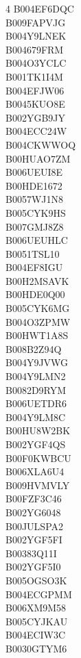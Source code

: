 \begin{multicols}{4}
	B004EF6DQC\\ B009FAPVJG\\ B004Y9LNEK\\ B004679FRM\\ B004O3YCLC\\ B001TK1I4M\\
	B004EFJW06\\ B0045KUO8E\\ B002YGB9JY\\ B004ECC24W\\ B004CKWWOQ\\ B00HUAO7ZM\\
	B006UEUI8E\\ B00HDE1672\\ B0057WJ1N8\\ B005CYK9HS\\ B007GMJ8Z8\\ B006UEUHLC\\
	B0051TSL10\\ B004EF8IGU\\ B00H2MSAVK\\ B00HDE0Q00\\ B005CYK6MG\\ B004O3ZPMW\\
	B00HWT1A8S\\ B008B2Z94Q\\ B004Y9JVWG\\ B004Y9LMN2\\ B0082D9RYM\\ B006UETDR6\\
	B004Y9LM8C\\ B00HU8W2BK\\ B002YGF4QS\\ B00F0KWBCU\\ B006XLA6U4\\ B009HVMVLY\\
	B00FZF3C46\\ B002YG6048\\ B00JULSPA2\\ B002YGF5FI\\ B00383Q11I\\ B002YGF5I0\\
	B005OGSO3K\\ B004ECGPMM\\ B006XM9M58\\ B005CYJKAU\\ B004ECIW3C\\ B0030GTYM6
\end{multicols}



